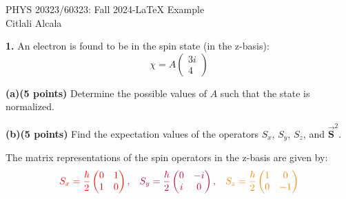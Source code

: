 \documentclass[9pt]{article}
\begin{document}
\def\pos{\medskip\quad}
\def\subpos{\smallskip \qquad}

\begin{center}
{\large
PHYS 20323/60323: Fall 2024-LaTeX Example
}\\
{\large Citlali Alcala\ \star} \\[0.25in]
\end{center}

\textbf{1.}  
An electron is found to be in the spin state (in the z-basis):
\[\chi = A \begin{pmatrix} 3i \\ 4 \end{pmatrix}\]


\textbf{(a)(5 points)} Determine the possible values of \( A \) such that the state is normalized.

\vspace{1cm}


\textbf{(b)(5 points)} Find the expectation values of the operators \( S_x \), \( S_y \), \( S_z \), and \( \vec{\mathbf{S}}^2 \).

\vspace{1cm}

The matrix representations of the spin operators in the z-basis are given by:
\[
\textcolor{red}{S_x = \frac{\hbar}{2} \begin{pmatrix} 0 & 1 \\ 1 & 0 \end{pmatrix}, \quad }
\textcolor{purple}{S_y = \frac{\hbar}{2} \begin{pmatrix} 0 & -i \\ i & 0 \end{pmatrix}, \quad}
\textcolor{orange}{S_z = \frac{\hbar}{2} \begin{pmatrix} 1 & 0 \\ 0 & -1 \end{pmatrix}}
\]
\end{document}
